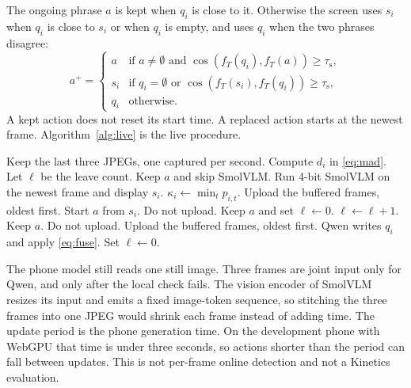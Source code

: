 The ongoing phrase $a$ is kept when $q_i$ is close to it. Otherwise the
screen uses $s_i$ when $q_i$ is close to $s_i$ or when $q_i$ is empty, and
uses $q_i$ when the two phrases disagree:
\begin{equation}
\label{eq:fuse}
a^{+} =
\begin{cases}
a & \text{if } a\neq\emptyset \text{ and } \cos(f_T(q_i),f_T(a))\ge\tau_{\mathrm{s}},\\
s_i & \text{if } q_i=\emptyset \text{ or } \cos(f_T(s_i),f_T(q_i))\ge\tau_{\mathrm{s}},\\
q_i & \text{otherwise.}
\end{cases}
\end{equation}
A kept action does not reset its start time. A replaced action starts at
the newest frame. Algorithm~\ref{alg:live} is the live procedure.

\begin{algorithm}[t]
\caption{Live phrase with a quiet skip and a two-frame leave}
\label{alg:live}
\begin{algorithmic}[1]
\STATE Keep the last three JPEGs, one captured per second.
\STATE Compute \(d_i\) in \eqref{eq:mad}. Let \(\ell\) be the leave count.
    \STATE Keep \(a\) and skip SmolVLM.
\ELSE
    \STATE Run 4-bit SmolVLM on the newest frame and display \(s_i\).
    \STATE \(\kappa_i\leftarrow\min_t p_{i,t}\).
        \STATE Upload the buffered frames, oldest first.
        \STATE Start \(a\) from \(s_i\). Do not upload.
        \STATE Keep \(a\) and set \(\ell\leftarrow 0\).
    \ELSE
        \STATE \(\ell\leftarrow\ell+1\).
            \STATE Keep \(a\). Do not upload.
        \ELSE
            \STATE Upload the buffered frames, oldest first.
        \ENDIF
    \ENDIF
\ENDIF
{}
    \STATE Qwen writes \(q_i\) and apply \eqref{eq:fuse}.
    \STATE Set \(\ell\leftarrow 0\).
\ENDIF
\end{algorithmic}
\end{algorithm}

The phone model still reads one still image. Three frames are joint input
only for Qwen, and only after the local check fails. The vision encoder of
SmolVLM resizes its input and emits a fixed image-token sequence, so
stitching the three frames into one JPEG would shrink each frame instead of
adding time. The update period is the phone generation time. On the
development phone with WebGPU that time is under three seconds, so actions
shorter than the period can fall between updates. This is not per-frame
online detection and not a Kinetics evaluation.


